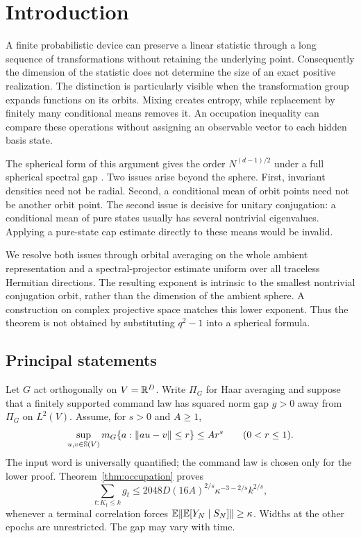 \section{Introduction}
A finite probabilistic device can preserve a linear statistic through a
long sequence of transformations without retaining the underlying point.
Consequently the dimension of the statistic does not determine the size
of an exact positive realization. The distinction is particularly visible
when the transformation group expands functions on its orbits. Mixing
creates entropy, while replacement by finitely many conditional means
removes it. An occupation inequality can compare these operations without
assigning an observable vector to each hidden basis state.

The spherical form of this argument gives the order
$N^{(d-1)/2}$ under a full spherical spectral gap \cite{GTF37}. Two issues
arise beyond the sphere. First, invariant densities need not be radial.
Second, a conditional mean of orbit points need not be another orbit
point. The second issue is decisive for unitary conjugation: a conditional
mean of pure states usually has several nontrivial eigenvalues. Applying
a pure-state cap estimate directly to these means would be invalid.

We resolve both issues through orbital averaging on the whole ambient
representation and a spectral-projector estimate uniform over all
traceless Hermitian directions. The resulting exponent is intrinsic to
the smallest nontrivial conjugation orbit, rather than the dimension of
the ambient sphere. A construction on complex projective space matches
this lower exponent. Thus the theorem is not obtained by substituting
$q^2-1$ into a spherical formula.

\subsection{Principal statements}
Let $G$ act orthogonally on $V=\mathbb R^D$. Write $\Pi_G$ for Haar averaging
and suppose that a finitely supported command law has squared norm gap
$g>0$ away from $\Pi_G$ on $L^2(V)$. Assume, for $s>0$ and $A\ge1$,
\begin{equation}\label{eq:intro-smallball}
 \sup_{u,v\in\mathbb S(V)}
 m_G\{a:\lVert a u-v\rVert\le r\}\le A r^s\qquad(0<r\le1).
\end{equation}
The input word is universally quantified; the command law is chosen only
for the lower proof. Theorem~\ref{thm:occupation} proves
\begin{equation}\label{eq:intro-budget}
 \sum_{t:K_t\le k}g_t
 \le 2048D(16A)^{2/s}\kappa^{-3-2/s}k^{2/s},
\end{equation}
whenever a terminal correlation forces $\mathbb E\lVert\mathbb E[Y_N\mid S_N]\rVert\ge\kappa$.
Widths at the other epochs are unrestricted. The gap may vary with time.

